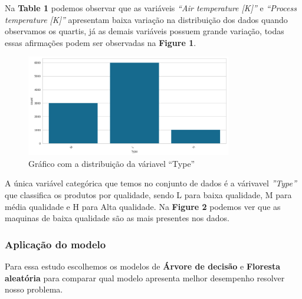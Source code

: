 \documentclass[
  oneclumn]{article}
\begin{document}
Na \textbf{Table 1} podemos observar que as variáveis \emph{``Air
temperature {[}K{]}''} e \emph{``Process temperature {[}K{]}''}
apresentam baixa variação na distribuição dos dados quando observamos os
quartis, já as demais variáveis possuem grande variação, todas essas
afirmações podem ser observadas na \textbf{Figure 1}.

\begin{figure}[H]

{\centering \includegraphics[width=0.8\textwidth,height=\textheight]{graficos_categoricas.png}

}

\caption{Gráfico com a distribuição da váriavel ``Type''}

\end{figure}%

A única variável categórica que temos no conjunto de dados é a várivavel
\emph{''Type''} que classifica os produtos por qualidade, sendo L para
baixa qualidade, M para média qualidade e H para Alta qualidade. Na
\textbf{Figure 2} podemos ver que as maquinas de baixa qualidade são as
mais presentes nos dados.

\newpage

\subsubsection{Aplicação do modelo}\label{aplicauxe7uxe3o-do-modelo}

Para essa estudo escolhemos os modelos de \textbf{Árvore de decisão} e
\textbf{Floresta aleatória} para comparar qual modelo apresenta melhor
desempenho resolver nosso problema.
\end{document}
